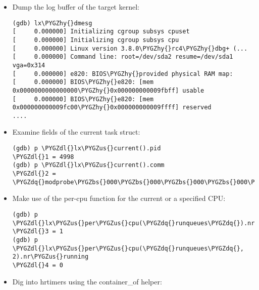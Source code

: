 \documentclass[a4paper,8pt,english]{sphinxmanual}
\def\PYGZbs{\char`\\}
\def\PYGZus{\char`\_}
\def\PYGZdl{\char`\$}
\def\PYGZhy{\char`\-}
\def\PYGZdq{\char`\"}
\begin{document}
\begin{itemize}
\begin{Verbatim}[commandchars=\\\{\}]
Breakpoint 1, btrfs\PYGZus{}init\PYGZus{}sysfs () at /home/user/linux/fs/btrfs/sysfs.c:36
36              btrfs\PYGZus{}kset = kset\PYGZus{}create\PYGZus{}and\PYGZus{}add(\PYGZdq{}btrfs\PYGZdq{}, NULL, fs\PYGZus{}kobj);
\end{Verbatim}

\item {} 
Dump the log buffer of the target kernel:

\begin{Verbatim}[commandchars=\\\{\}]
(gdb) lx\PYGZhy{}dmesg
[     0.000000] Initializing cgroup subsys cpuset
[     0.000000] Initializing cgroup subsys cpu
[     0.000000] Linux version 3.8.0\PYGZhy{}rc4\PYGZhy{}dbg+ (...
[     0.000000] Command line: root=/dev/sda2 resume=/dev/sda1 vga=0x314
[     0.000000] e820: BIOS\PYGZhy{}provided physical RAM map:
[     0.000000] BIOS\PYGZhy{}e820: [mem 0x0000000000000000\PYGZhy{}0x000000000009fbff] usable
[     0.000000] BIOS\PYGZhy{}e820: [mem 0x000000000009fc00\PYGZhy{}0x000000000009ffff] reserved
....
\end{Verbatim}

\item {} 
Examine fields of the current task struct:

\begin{Verbatim}[commandchars=\\\{\}]
(gdb) p \PYGZdl{}lx\PYGZus{}current().pid
\PYGZdl{}1 = 4998
(gdb) p \PYGZdl{}lx\PYGZus{}current().comm
\PYGZdl{}2 = \PYGZdq{}modprobe\PYGZbs{}000\PYGZbs{}000\PYGZbs{}000\PYGZbs{}000\PYGZbs{}000\PYGZbs{}000\PYGZbs{}000\PYGZdq{}
\end{Verbatim}

\item {} 
Make use of the per-cpu function for the current or a specified CPU:

\begin{Verbatim}[commandchars=\\\{\}]
(gdb) p \PYGZdl{}lx\PYGZus{}per\PYGZus{}cpu(\PYGZdq{}runqueues\PYGZdq{}).nr\PYGZus{}running
\PYGZdl{}3 = 1
(gdb) p \PYGZdl{}lx\PYGZus{}per\PYGZus{}cpu(\PYGZdq{}runqueues\PYGZdq{}, 2).nr\PYGZus{}running
\PYGZdl{}4 = 0
\end{Verbatim}

\item {} 
Dig into hrtimers using the container\_of helper:


\end{itemize}
\end{document}
